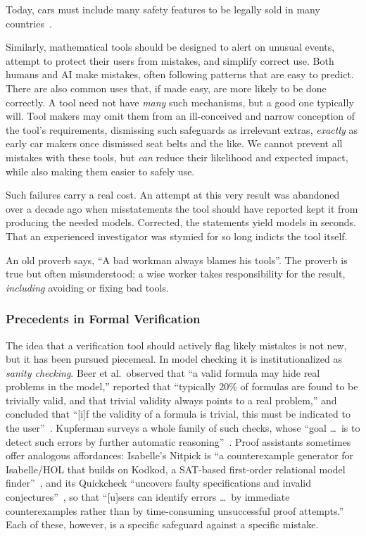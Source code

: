 Today, cars must include many safety features to be legally sold in many countries~\cite{fmvss208,eugsr2019,unr16}.

Similarly, mathematical tools should be designed to alert on unusual events, attempt to protect their users from mistakes, and simplify correct use. Both humans and AI make mistakes, often following patterns that are easy to predict. There are also common uses that, if made easy, are more likely to be done correctly. A tool need not have \emph{many} such mechanisms, but a good one typically will. Tool makers may omit them from an ill-conceived and narrow conception of the tool's requirements, dismissing such safeguards as irrelevant extras, \emph{exactly} as early car makers once dismissed seat belts and the like. We cannot prevent all mistakes with these tools, but \emph{can} reduce their likelihood and expected impact, while also making them easier to safely use.

Such failures carry a real cost. An attempt at this very result was abandoned over a decade ago when misstatements the tool should have reported kept it from producing the needed models. Corrected, the statements yield models in seconds. That an experienced investigator was stymied for so long indicts the tool itself.

An old proverb says, ``A bad workman always blames his tools''. The proverb is true but often misunderstood; a wise worker takes responsibility for the result, \emph{including} avoiding or fixing bad tools.

\subsubsection{Precedents in Formal Verification}

The idea that a verification tool should actively flag likely mistakes is not new, but it has been pursued piecemeal. In model checking it is institutionalized as \emph{sanity checking}. Beer et al.\ observed that ``a valid formula may hide real problems in the model,'' reported that ``typically 20\% of formulas are found to be trivially valid, and that trivial validity always points to a real problem,'' and concluded that ``[i]f the validity of a formula is trivial, this must be indicated to the user''~\cite{beer2001vacuity}. Kupferman surveys a whole family of such checks, whose ``goal \dots\ is to detect such errors by further automatic reasoning''~\cite{kupferman2006sanity}. Proof assistants sometimes offer analogous affordances: Isabelle's Nitpick is ``a counterexample generator for Isabelle/HOL that builds on Kodkod, a SAT-based first-order relational model finder''~\cite{blanchette2010nitpick}, and its Quickcheck ``uncovers faulty specifications and invalid conjectures''~\cite{bulwahn2012quickcheck}, so that ``[u]sers can identify errors \dots\ by immediate counterexamples rather than by time-consuming unsuccessful proof attempts.'' Each of these, however, is a specific safeguard against a specific mistake.

